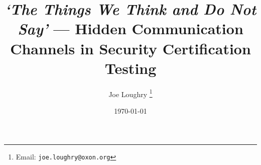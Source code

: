 \documentclass[10pt,a4paper]{article}
\begin{document}
\title{\emph{`The Things We Think and Do Not Say'} --- Hidden Communication
Channels in Security Certification Testing}

\author{Joe Loughry%
\thanks{Email: \texttt{joe.loughry@oxon.org}}}

\date{\today}

\maketitle

\begin{abstract}
	
\end{abstract}
\thispagestyle{empty}
\end{document}
